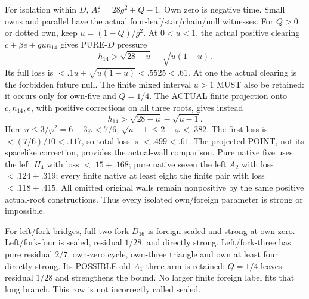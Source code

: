 \documentclass[11pt]{article}
\begin{document}
For isolation within \(D\),
\(A_c^2=28g^2+Q-1\).
Own zero is negative time.
Small owns and parallel have the actual
four-leaf/star/chain/null witnesses.
For \(Q>0\) or dotted own, keep
\(u=(1-Q)/g^2\).
At \(0<u<1\), the actual positive
clearing \(c+\beta e+gu n_{14}\)
gives PURE-\(D\) pressure
\[
             h_{14}>\sqrt{28-u}-\sqrt{u(1-u)} .
\]
Its full loss is \(<.1u+\sqrt{u(1-u)}
<.5525<.61\).
At one the actual clearing is the
forbidden future null.
The finite mixed interval \(u>1\)
MUST also be retained:
it occurs only for own-five and
\(Q=1/4\).
The ACTUAL finite projection onto
\(c,n_{14},e\), with positive corrections
on all three roots, gives instead
\[
                      h_{14}>\sqrt{28-u}-\sqrt{u-1}.
\]
Here \(u\le3/\varphi^2=6-3\varphi<7/6\),
\(\sqrt{u-1}\le2-\varphi<.382\).
The first loss is \(<(7/6)/10<.117\),
so total loss is \(<.499<.61\).
The projected POINT, not its spacelike
correction, provides the actual-wall
comparison.
Pure native five uses the left \(H_4\)
with loss \(<.15+.168\);
pure native seven the left \(A_2\)
with loss \(<.124+.319\);
every finite native at least eight
the finite pair with loss \(<.118+.415\).
All omitted original walls remain
nonpositive by the same positive
actual-root constructions.
Thus every isolated own/foreign parameter
is strong or impossible.

For left/fork bridges, full two-fork
\(D_{16}\) is foreign-sealed and strong
at own zero.
Left/fork-four is sealed, residual \(1/28\),
and directly strong.
Left/fork-three has pure residual \(2/7\),
own-zero cycle, own-three triangle and
own at least four directly strong.
Its POSSIBLE old-\(A_1\)-three arm is
retained: \(Q=1/4\) leaves residual
\(1/28\) and strengthens the bound.
No larger finite foreign label fits
that long branch.
This row is not incorrectly called sealed.
\end{document}
